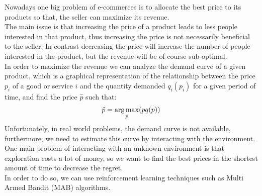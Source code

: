 Nowadays one big problem of e-commerces is to allocate the best price to its products so that,
the seller can maximize its revenue.\\
The main issue is that increasing the price of a product leads to less people interested in that product, thus
increasing the price is not necessarily beneficial to the seller. In contrast decreasing the price will increase the number
of people interested in the product, but the revenue will be of course sub-optimal.\\
In order to maximize the revenue we can analyze the demand curve of a given product, which is
a graphical representation of the relationship between the price $p_i$ of a good or service $i$ and the quantity demanded $q_i(p_i)$
for a given period of time, and find the price $\hat{p}$ such that:
\begin{align*}
    \hat{p} = \operatorname*{arg\,max}_p(pq(p))
\end{align*}
Unfortunately, in real world problems, the demand curve is not available, furthermore, we need to estimate this curve by interacting with the environment. One main problem of interacting with an unknown environment is that exploration costs a lot of money, so we want to find the best prices in the shortest amount of time to decrease the regret. \\
In order to do so, we can use reinforcement learning techniques such as Multi Armed Bandit (MAB) algorithms.

